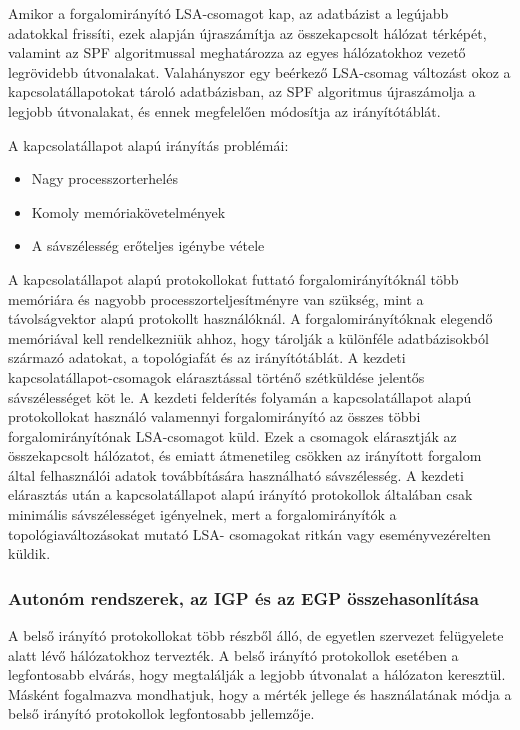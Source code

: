 Amikor a forgalomirányító LSA-csomagot kap, az adatbázist a legújabb adatokkal frissíti,
ezek alapján újraszámítja az összekapcsolt hálózat térképét, valamint az SPF algoritmussal
meghatározza az egyes hálózatokhoz vezető legrövidebb útvonalakat. Valahányszor egy
beérkező LSA-csomag változást okoz a kapcsolatállapotokat tároló adatbázisban, az SPF
algoritmus újraszámolja a legjobb útvonalakat, és ennek megfelelően módosítja az
irányítótáblát.

A kapcsolatállapot alapú irányítás problémái:
\begin{itemize}[nosep]
	\item Nagy processzorterhelés
	\item Komoly memóriakövetelmények
	\item A sávszélesség erőteljes igénybe vétele
\end{itemize}

A kapcsolatállapot alapú protokollokat futtató forgalomirányítóknál több memóriára és
nagyobb processzorteljesítményre van szükség, mint a távolságvektor alapú protokollt
használóknál. A forgalomirányítóknak elegendő memóriával kell rendelkezniük ahhoz, hogy
tárolják a különféle adatbázisokból származó adatokat, a topológiafát és az irányítótáblát. A
kezdeti kapcsolatállapot-csomagok elárasztással történő szétküldése jelentős sávszélességet
köt le. A kezdeti felderítés folyamán a kapcsolatállapot alapú protokollokat használó
valamennyi forgalomirányító az összes többi forgalomirányítónak LSA-csomagot küld. Ezek
a csomagok elárasztják az összekapcsolt hálózatot, és emiatt átmenetileg csökken az irányított
forgalom által felhasználói adatok továbbítására használható sávszélesség. A kezdeti
elárasztás után a kapcsolatállapot alapú irányító protokollok általában csak minimális
sávszélességet igényelnek, mert a forgalomirányítók a topológiaváltozásokat mutató LSA-
csomagokat ritkán vagy eseményvezérelten küldik.

\subsubsection{Autonóm rendszerek, az IGP és az EGP összehasonlítása}
A belső irányító protokollokat több részből álló, de egyetlen szervezet felügyelete alatt lévő
hálózatokhoz tervezték. A belső irányító protokollok esetében a legfontosabb elvárás, hogy
megtalálják a legjobb útvonalat a hálózaton keresztül. Másként fogalmazva mondhatjuk, hogy
a mérték jellege és használatának módja a belső irányító protokollok legfontosabb jellemzője.

